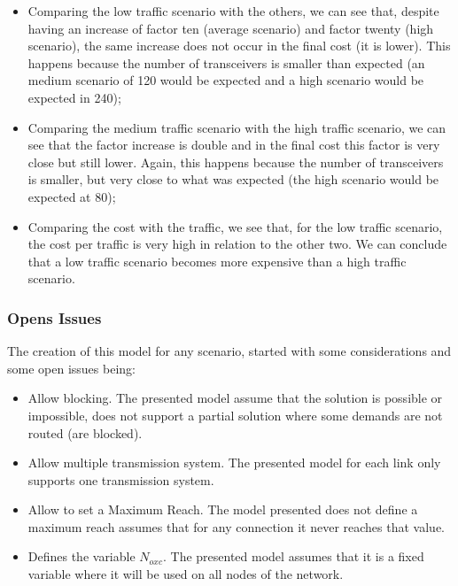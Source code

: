 \begin{itemize}
    \item Comparing the low traffic scenario with the others, we can see that, despite having an increase of factor ten (average scenario) and factor twenty (high scenario), the same increase does not occur in the final cost (it is lower). This happens because the number of transceivers is smaller than expected (an medium scenario of 120 would be expected and a high scenario would be expected in 240);
    \item Comparing the medium traffic scenario with the high traffic scenario, we can see that the factor increase is double and in the final cost this factor is very close but still lower. Again, this happens because the number of transceivers is smaller, but very close to what was expected (the high scenario would be expected at 80);
    \item Comparing the cost with the traffic, we see that, for the low traffic scenario, the cost per traffic is very high in relation to the other two. We can conclude that a low traffic scenario becomes more expensive than a high traffic scenario.
\end{itemize}


\vspace{13pt}
\subsubsection{Opens Issues}

The creation of this model for any scenario, started with some considerations and some open issues being:

\begin{itemize}
  \item Allow blocking.
  \subitem The presented model assume that the solution is possible or impossible, does not support a partial solution where some demands are not routed (are blocked).
  \item Allow multiple transmission system.
  \subitem The presented model for each link only supports one transmission system.
  \item Allow to set a Maximum Reach.
  \subitem The model presented does not define a maximum reach assumes that for any connection it never reaches that value.
  \item Defines the variable $N_{oxc}$.
  \subitem The presented model assumes that it is a fixed variable where it will be used on all nodes of the network.
\end{itemize}

